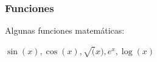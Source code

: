 \begin{frame}
  \frametitle{Funciones}

Algunas funciones matemáticas:

$\sin(x), \cos(x), \sqrt(x), e^x, \log(x)$

\end{frame}

